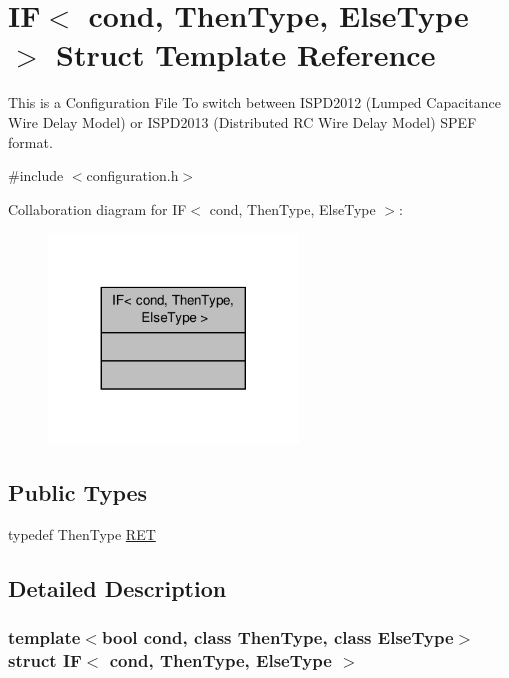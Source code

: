\hypertarget{structIF}{\section{I\-F$<$ cond, Then\-Type, Else\-Type $>$ Struct Template Reference}
\label{structIF}
}


This is a Configuration File To switch between I\-S\-P\-D2012 (Lumped Capacitance Wire Delay Model) or I\-S\-P\-D2013 (Distributed R\-C Wire Delay Model) S\-P\-E\-F format.  




{\ttfamily \#include $<$configuration.\-h$>$}



Collaboration diagram for I\-F$<$ cond, Then\-Type, Else\-Type $>$\-:\nopagebreak
\begin{figure}[H]
\begin{center}
\leavevmode
\includegraphics[width=188pt]{structIF__coll__graph}
\end{center}
\end{figure}
\subsection*{Public Types}
\begin{DoxyCompactItemize}
\item 
typedef Then\-Type \hyperlink{structIF_af93da5fd47eed555ff23c8d9022f8212}{R\-E\-T}
\end{DoxyCompactItemize}


\subsection{Detailed Description}
\subsubsection*{template$<$bool cond, class Then\-Type, class Else\-Type$>$struct I\-F$<$ cond, Then\-Type, Else\-Type $>$}

